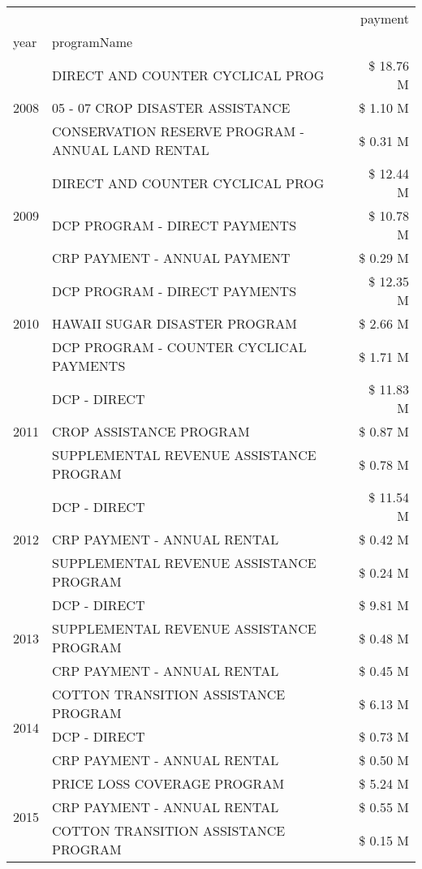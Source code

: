\begin{tabular}{llr}
\toprule
 &  & payment \\
year & programName &  \\
\midrule
\multirow[t]{3}{*}{2008} & DIRECT AND COUNTER CYCLICAL PROG & \$ 18.76 M \\
 & 05 - 07 CROP DISASTER ASSISTANCE & \$ 1.10 M \\
 & CONSERVATION RESERVE PROGRAM - ANNUAL LAND RENTAL & \$ 0.31 M \\
\cline{1-3}
\multirow[t]{3}{*}{2009} & DIRECT AND COUNTER CYCLICAL PROG & \$ 12.44 M \\
 & DCP PROGRAM - DIRECT PAYMENTS & \$ 10.78 M \\
 & CRP PAYMENT - ANNUAL PAYMENT & \$ 0.29 M \\
\cline{1-3}
\multirow[t]{3}{*}{2010} & DCP PROGRAM - DIRECT PAYMENTS & \$ 12.35 M \\
 & HAWAII SUGAR DISASTER PROGRAM & \$ 2.66 M \\
 & DCP PROGRAM - COUNTER CYCLICAL PAYMENTS & \$ 1.71 M \\
\cline{1-3}
\multirow[t]{3}{*}{2011} & DCP - DIRECT & \$ 11.83 M \\
 & CROP ASSISTANCE PROGRAM & \$ 0.87 M \\
 & SUPPLEMENTAL REVENUE ASSISTANCE PROGRAM & \$ 0.78 M \\
\cline{1-3}
\multirow[t]{3}{*}{2012} & DCP - DIRECT & \$ 11.54 M \\
 & CRP PAYMENT - ANNUAL RENTAL & \$ 0.42 M \\
 & SUPPLEMENTAL REVENUE ASSISTANCE PROGRAM & \$ 0.24 M \\
\cline{1-3}
\multirow[t]{3}{*}{2013} & DCP - DIRECT & \$ 9.81 M \\
 & SUPPLEMENTAL REVENUE ASSISTANCE PROGRAM & \$ 0.48 M \\
 & CRP PAYMENT - ANNUAL RENTAL & \$ 0.45 M \\
\cline{1-3}
\multirow[t]{3}{*}{2014} & COTTON TRANSITION ASSISTANCE PROGRAM & \$ 6.13 M \\
 & DCP - DIRECT & \$ 0.73 M \\
 & CRP PAYMENT - ANNUAL RENTAL & \$ 0.50 M \\
\cline{1-3}
\multirow[t]{3}{*}{2015} & PRICE LOSS COVERAGE PROGRAM & \$ 5.24 M \\
 & CRP PAYMENT - ANNUAL RENTAL & \$ 0.55 M \\
 & COTTON TRANSITION ASSISTANCE PROGRAM & \$ 0.15 M \\
\cline{1-3}

\end{tabular}
